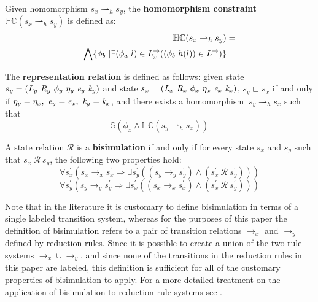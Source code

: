\begin{definition}
\label{def:hc}
Given homomorphism $s_x \rightharpoonup_{h} s_y$, the \textbf{homomorphism constraint} $\mathbb{HC}(s_x \rightharpoonup_{h} s_y)$ is defined as:
\begin{align*}
\mathbb{HC}(s_x \rightharpoonup_{h} s_y) &= \\
 \bigwedge \{ \phi_b\ | \exists (\phi_a\ l) \in \emph{L}_x^\rightarrow ( (\phi_b\ h(l)) \in \emph{L}^\rightarrow)\} 
\end{align*}
\end{definition}

\begin{definition}
\label{representation}
The \textbf{representation relation} is defined as follows: given state $s_y = ( \cfgnt{L}_y\ \cfgnt{R}_y\ \phi_y\ \eta_y\ \cfgnt{e}_y\ \cfgnt{k}_y )$ and state $s_x = ( \cfgnt{L}_x\ \cfgnt{R}_x\ \phi_x\ \eta_x\ \cfgnt{e}_x\ \cfgnt{k}_x )$, $s_y \sqsubset s_x $ if and only if $\eta_y = \eta_x ,\ \emph{e}_y = \emph{e}_x ,\ \emph{k}_y = \emph{k}_x$, and there exists a homomorphism $\ s_y \rightharpoonup_{h} s_x $ such that 
\begin{equation}
\label{eqn:valid}
 \mathbb{S}( \phi_x \wedge \mathbb{HC}(s_y \rightharpoonup_{h} s_x) ) 
\end{equation}
\end{definition}

\begin{definition}
\label{bisimulation}
A state relation $\mathcal{R}$ is a \textbf{bisimulation} if and only if for every state $s_x$ and $s_y$ such that $s_x\ \mathcal{R}\ s_y$, the following two properties hold: 
\begin{equation}
\label{eqn:BisimulationForwards}
\forall s_x^\prime ( s_x \rightarrow_x s_x^\prime \Rightarrow \exists s_y^\prime( (s_y \rightarrow_y s_y^\prime )\wedge (s_x^\prime\ \mathcal{R}\ s_y^\prime ))  )
\end{equation}
\begin{equation}
\label{eqn:BisimulationBackwards}
\forall s_y^\prime ( s_y \rightarrow_y s_y^\prime\Rightarrow \exists s_x^\prime( (s_x \rightarrow_x s_x^\prime )\wedge (s_x^\prime\ \mathcal{R}\ s_y^\prime ))  )
\end{equation}
\end{definition}

Note that in the literature it is customary to define bisimulation in terms of a single labeled transition system, whereas for the purposes of this paper the definition of bisimulation refers to a pair of transition relations $\rightarrow_x$ and $\rightarrow_y$ defined by reduction rules. Since it is possible to create a union of the two rule systems $\rightarrow_x \cup \rightarrow_y$, and since none of the transitions in the reduction rules in this paper are labeled, this definition is sufficient for all of the customary properties of bisimulation to apply. For a more detailed treatment on the application of bisimulation to reduction rule systems see \cite{GSE:barbedbisimulation}.

